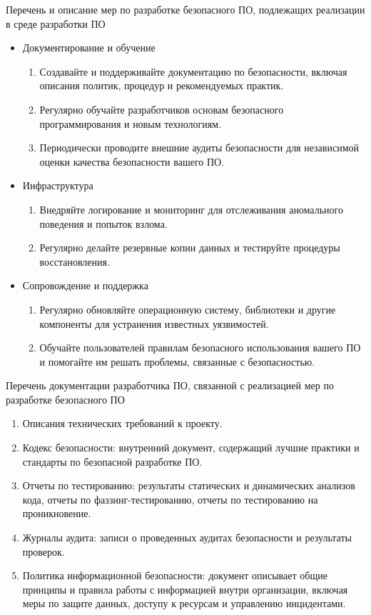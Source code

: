 \documentclass[10pt]{beamer}
\begin{document}
\begin{frame}{Перечень и описание мер по разработке безопасного ПО, подлежащих реализации в среде разработки ПО}
    \begin{itemize}
\item Документирование и обучение
\begin{enumerate}
    \item Создавайте и поддерживайте документацию по безопасности, включая описания политик, процедур и рекомендуемых практик.
    \item Регулярно обучайте разработчиков основам безопасного программирования и новым технологиям.
    \item Периодически проводите внешние аудиты безопасности для независимой оценки качества безопасности вашего ПО.
\end{enumerate}

\item Инфраструктура
\begin{enumerate}
    \item Внедряйте логирование и мониторинг для отслеживания аномального поведения и попыток взлома.
    \item Регулярно делайте резервные копии данных и тестируйте процедуры восстановления.
\end{enumerate}

\item Сопровождение и поддержка
\begin{enumerate}
    \item Регулярно обновляйте операционную систему, библиотеки и другие компоненты для устранения известных уязвимостей.
    \item Обучайте пользователей правилам безопасного использования вашего ПО и помогайте им решать проблемы, связанные с безопасностью.
\end{enumerate}
\end{itemize}
\end{frame}

\begin{frame}{Перечень документации разработчика ПО, связанной с реализацией мер по разработке безопасного ПО}
    \begin{enumerate}
        \item Описания технических требований к проекту.
        \item Кодекс безопасности: внутренний документ, содержащий лучшие практики и стандарты по безопасной разработке ПО.
        \item Отчеты по тестированию: результаты статических и динамических анализов кода, отчеты по фаззинг-тестированию, отчеты по тестированию на проникновение.
        \item Журналы аудита: записи о проведенных аудитах безопасности и результаты проверок.
        \item Политика информационной безопасности: документ описывает общие принципы и правила работы с информацией внутри организации, включая меры по защите данных, доступу к ресурсам и управлению инцидентами.
    \end{enumerate}
\end{frame}
\end{document}
